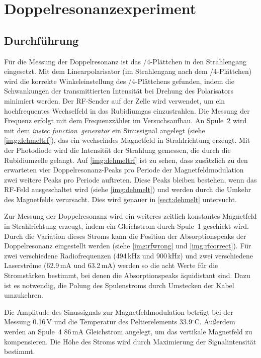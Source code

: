\section{Doppelresonanzexperiment}
\subsection{Durchführung}
Für die Messung der Doppelresonanz ist das \textlambda/4-Plättchen in den Strahlengang eingesetzt.
Mit dem Linearpolarisator (im Strahlengang nach dem \textlambda/4-Plättchen) wird die
korrekte Win\-kel\-ein\-stel\-lung des \textlambda/4-Plättchens gefunden,
indem die Schwankungen der transmittierten Intensität
bei Drehung des Polarisators minimiert werden.
Der RF-Sender auf der Zelle wird verwendet, um ein hochfrequentes Wechselfeld in das Rubidiumgas einzustrahlen.
Die Messung der Frequenz erfolgt mit dem Frequenzzähler im Versuchsaufbau.
An Spule~2 wird mit dem \emph{instec function~generator} ein Sinussignal angelegt (siehe \autoref{img:dehmeltrf}),
das ein wechselndes Magnetfeld in Strahlrichtung erzeugt.
Mit der Photodiode wird die Intensität der Strahlung gemessen,
die durch die Rubidiumzelle gelangt.
Auf \autoref{img:dehmeltrf} ist zu sehen, dass zusätzlich zu den erwarteten vier Doppelresonanz-Peaks pro
Periode der Magnetfeldmodulation zwei weitere Peaks pro Periode auftreten.
Diese Peaks bleiben bestehen, wenn das RF-Feld ausgeschaltet wird (siehe \autoref{img:dehmelt}) und
werden durch die Umkehr des Magnetfelds verursacht. Dies wird genauer in \autoref{sect:dehmelt} untersucht.

Zur Messung der Doppelresonanz wird ein weiteres zeitlich konstantes Magnetfeld in Strahlrichtung erzeugt,
indem ein Gleichstrom durch Spule~1 geschickt wird.
Durch die Variation dieses Stroms kann die Position der Absorptionspeaks der Doppelresonanz eingestellt werden
(siehe \autoref{img:rfwrong} und \autoref{img:rfcorrect}).
Für zwei verschiedene Radiofrequenzen (494\,kHz und 900\,kHz) und
zwei verschiedene Laserströme (62.9\,mA und 63.2\,mA) werden so die acht 
Werte für die Stromstärken bestimmt, bei denen die Absorptionspeaks äquidistant sind.
Dazu ist es notwendig, die Polung des Spulenstroms durch Umstecken der Kabel umzukehren.

Die Amplitude des Sinussignals zur Magnetfeldmodulation beträgt bei der Messung 0.16\,V und
die Temperatur des Peltierelements 33.9$^\circ$C.
Außerdem werden an Spule~4 86\,mA Gleichstrom angelegt, um das vertikale Magnetfeld zu kompensieren.
Die Höhe des Stroms wird durch Maximierung der Signalintensität bestimmt.

